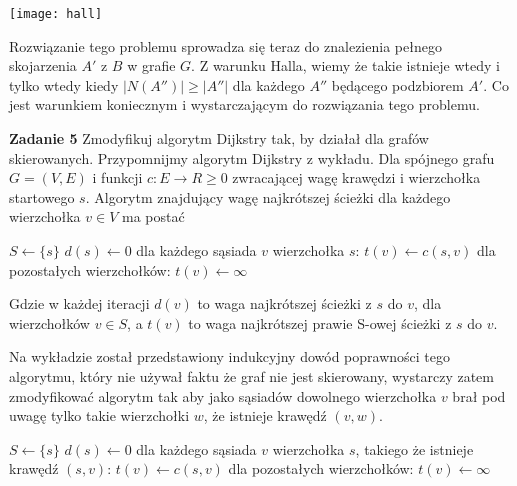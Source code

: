 \documentclass[12pt,a4paper]{article}
\begin{document}
\begin{center}
	\texttt{[image: hall]}
\end{center}

Rozwiązanie tego problemu sprowadza się teraz do znalezienia pełnego skojarzenia \(A'\) z \(B\) w grafie \(G\). Z warunku Halla, wiemy że takie istnieje wtedy i tylko wtedy kiedy \( |N(A'')| \geq |A''| \) dla każdego \(A''\) będącego podzbiorem \(A'\). Co jest warunkiem koniecznym i wystarczającym do rozwiązania tego problemu.

\newpage
\vskip 0.5cm
\noindent
\textbf{Zadanie 5} Zmodyfikuj algorytm Dijkstry tak, by działał dla grafów skierowanych.
\vskip 0.2cm
Przypomnijmy algorytm Dijkstry z wykładu. Dla spójnego grafu \(G = (V,E) \) i funkcji \(c: E \rightarrow R \geq 0\) zwracającej wagę krawędzi i wierzchołka startowego \(s\). Algorytm znajdujący wagę najkrótszej ścieżki dla każdego wierzchołka \(v \in V\) ma postać

\begin{algorithm}[H]
	\( S\gets \{s\} \)\;
	\( d(s) \gets 0 \)\;
	dla każdego sąsiada \(v\) wierzchołka \(s\): \( t(v) \gets c(s,v) \)\;
	dla pozostałych wierzchołków: \( t(v) \gets \infty \)\;
\end{algorithm}

Gdzie w każdej iteracji \(d(v)\) to waga najkrótszej ścieżki z \(s\) do \(v\), dla wierzchołków \( v \in S\), a \(t(v)\) to waga najkrótszej prawie S-owej ścieżki z \(s\) do \(v\). 

Na wykładzie został przedstawiony indukcyjny dowód poprawności tego algorytmu, który nie używał faktu że graf nie jest skierowany, wystarczy zatem zmodyfikować algorytm tak aby jako sąsiadów dowolnego wierzchołka \(v\) brał pod uwagę tylko takie wierzchołki \(w\), że istnieje krawędź \( (v,w) \).

\begin{algorithm}[H]
	\( S\gets \{s\} \)\;
	\( d(s) \gets 0 \)\;
	dla każdego sąsiada \(v\) wierzchołka \(s\), takiego że istnieje krawędź \( (s,v) \): \( t(v) \gets c(s,v) \)\;
	dla pozostałych wierzchołków: \( t(v) \gets \infty \)\;
\end{algorithm}
\end{document}

